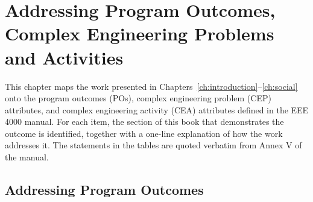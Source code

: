 %

\chapter{Addressing Program Outcomes, Complex Engineering Problems and Activities}
\label{ch:po}

This chapter maps the work presented in Chapters~\ref{ch:introduction}--\ref{ch:social}
onto the program outcomes (POs), complex engineering problem (CEP)
attributes, and complex engineering activity (CEA) attributes defined in
the EEE 4000 manual. For each item, the section of this book that
demonstrates the outcome is identified, together with a one-line
explanation of how the work addresses it. The statements in the tables are
quoted verbatim from Annex V of the manual.


\section{Addressing Program Outcomes}
\label{sec:po}

